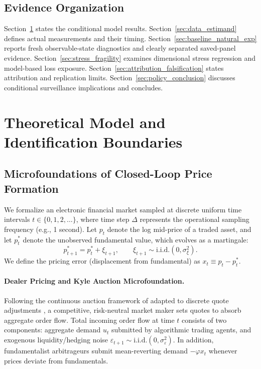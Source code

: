 \documentclass[12pt]{article}
\theoremstyle{definition}
\theoremstyle{remark}
\begin{document}
\subsection{Evidence Organization}
Section~\ref{sec:model} states the conditional model results. Section~\ref{sec:data_estimand} defines actual measurements and their timing. Section~\ref{sec:baseline_natural_exp} reports fresh observable-state diagnostics and clearly separated saved-panel evidence. Section~\ref{sec:stress_fragility} examines dimensional stress regression and model-based loss exposure. Section~\ref{sec:attribution_falsification} states attribution and replication limits. Section~\ref{sec:policy_conclusion} discusses conditional surveillance implications and concludes.

\section{Theoretical Model and Identification Boundaries}
\label{sec:model}

\subsection{Microfoundations of Closed-Loop Price Formation}
We formalize an electronic financial market sampled at discrete uniform time intervals $t \in \{0, 1, 2, \dots\}$, where time step $\Delta$ represents the operational sampling frequency (e.g., 1 second). Let $p_t$ denote the log mid-price of a traded asset, and let $p_t^*$ denote the unobserved fundamental value, which evolves as a martingale:
\begin{equation}
p_{t+1}^* = p_t^* + \xi_{t+1}, \qquad \xi_{t+1} \sim \text{i.i.d.}(0, \sigma_\xi^2).
\label{eq:fundamental_process}
\end{equation}
We define the pricing error (displacement from fundamental) as $x_t \equiv p_t - p_t^*$.

\paragraph{Dealer Pricing and Kyle Auction Microfoundation.}
Following the continuous auction framework of \citet{kyle1985continuous} adapted to discrete quote adjustments \citep{hasbrouck1991,bouchaud2004fluctuations}, a competitive, risk-neutral market maker sets quotes to absorb aggregate order flow. Total incoming order flow at time $t$ consists of two components: aggregate demand $u_t$ submitted by algorithmic trading agents, and exogenous liquidity/hedging noise $\varepsilon_{t+1} \sim \text{i.i.d.}(0, \sigma_\varepsilon^2)$. In addition, fundamentalist arbitrageurs submit mean-reverting demand $-\varphi x_t$ whenever prices deviate from fundamentals.
\end{document}
